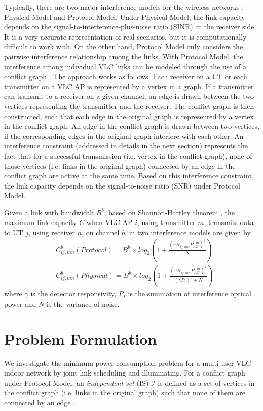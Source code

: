\documentclass[10pt,journal]{IEEEtran}
\begin{document}
Typically, there are two major interference models for the wireless networks \cite{gupta2000capacity}: Physical Model and Protocol Model. Under Physical Model, the link capacity depends on the signal-to-interference-plus-noise ratio (SINR) at the receiver side. It is a very accurate representation of real scenarios, but it is computationally difficult to work with. On the other hand, Protocol Model only considers the pairwise interference relationship among the links. With Protocol Model, the interference among individual VLC links can be modeled through the use of a conflict graph \cite{diestel2005graph}. The approach works as follows. Each receiver on a UT or each transmitter on a VLC AP is represented by a vertex in a graph. If a transmitter can transmit to a receiver on a given channel, an edge is drawn between the two vertices representing the transmitter and the receiver. The conflict graph is then constructed, such that each edge in the original graph is represented by a vertex in the conflict graph. An edge in the conflict graph is drawn between two vertices, if the corresponding edges in the original graph interfere with each other. An interference constraint (addressed in details in the next section) represents the fact that for a successful transmission (i.e. vertex in the conflict graph), none of those vertices (i.e. links in the original graph) connected by an edge in the conflict graph are active at the same time. Based on this interference constraint, the link capacity depends on the signal-to-noise ratio (SNR) under Protocol Model.


Given a link with bandwidth $B^{b}$, based on Shannon-Hartley theorem \cite{cover2012elements}, the maximum link capacity $C$ when VLC AP $i$, using transmitter $m$, transmits data to UT $j$, using receiver $n$, on channel $b$, in two interference models are given \cite{stefan2014hybrid} by
\begin{align}
&C_{ij,mn}^{b}(Protocol)=B^{b}\times log_{2}(1+\frac{(\gamma H_{ij,mn}P_{AC}^{i,m})^{2}}{N})\\
&C_{ij,mn}^{b}(Physical)=B^{b}\times log_{2}(1+\frac{(\gamma H_{ij,mn}P_{AC}^{i,m})^{2}}{(\gamma P_{I})^{2}+N})
\end{align}
where $\gamma$ is the detector responsivity, $P_{I}$ is the summation of interference optical power and $N$ is the variance of noise.





\section{Problem Formulation}\label{problem_formulation}
We investigate the minimum power consumption problem for a multi-user VLC indoor network by joint link scheduling and illuminating. For a conflict graph under Protocol Model, an {\it independent set} (IS) $\mathcal{I}$ is defined as a set of vertices in the conflict graph (i.e. links in the original graph) such that none of them are connected by an edge \cite{diestel2005graph}.
\end{document}
